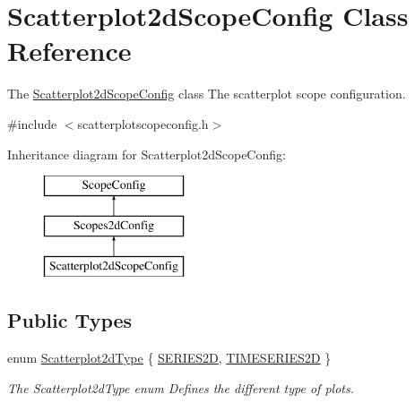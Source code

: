 \hypertarget{class_scatterplot2d_scope_config}{\section{\-Scatterplot2d\-Scope\-Config \-Class \-Reference}
\label{class_scatterplot2d_scope_config}
}


\-The \hyperlink{class_scatterplot2d_scope_config}{\-Scatterplot2d\-Scope\-Config} class \-The scatterplot scope configuration.  




{\ttfamily \#include $<$scatterplotscopeconfig.\-h$>$}

\-Inheritance diagram for \-Scatterplot2d\-Scope\-Config\-:\begin{figure}[H]
\begin{center}
\leavevmode
\includegraphics[height=3.000000cm]{class_scatterplot2d_scope_config}
\end{center}
\end{figure}
\subsection*{\-Public \-Types}
\begin{DoxyCompactItemize}
\item 
enum \hyperlink{group___scope_plugin_gac3cffd2a84d02f4ebfba6df970d03e97}{\-Scatterplot2d\-Type} \{ \hyperlink{group___scope_plugin_ggac3cffd2a84d02f4ebfba6df970d03e97a8ac04199dbef37beba1b81fe42278b3a}{\-S\-E\-R\-I\-E\-S2\-D}, 
\hyperlink{group___scope_plugin_ggac3cffd2a84d02f4ebfba6df970d03e97af135d74488370bcdd47ee9744b513263}{\-T\-I\-M\-E\-S\-E\-R\-I\-E\-S2\-D}
 \}
\begin{DoxyCompactList}\small\item\em \-The \-Scatterplot2d\-Type enum \-Defines the different type of plots. \end{DoxyCompactList}\end{DoxyCompactItemize}
